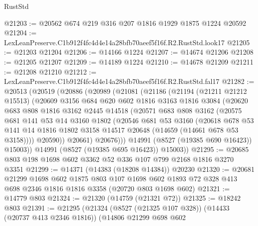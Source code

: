 \begin{lexlean}{RustStd}
\begin{coremodule}
@21203 := @20562 @674 @219 @316 @207 @1816 @1929 @1875 @1224 @20592
@21204 := LexLeanPreserve.C1b912f4fc4d4e14a28bfb70aeef5f16f.R2.RustStd.look17
@21205 := @21203 @21204
@21206 := @14166 @1224
@21207 := @14674 @21206
@21208 := @21205 @21207
@21209 := @14189 @1224
@21210 := @14678 @21209
@21211 := @21208 @21210
@21212 := LexLeanPreserve.C1b912f4fc4d4e14a28bfb70aeef5f16f.R2.RustStd.fal17
@21282 := @20513
    (@20519
      (@20886
        (@20989
          (@21081
            (@21186
              (@21194
                (@21211 @21212 @15513)
                (@20609
                  @3156
                  @684
                  @620
                  @602
                  @1816
                  @3163
                  @1816
                  @3084
                  (@20620
                    @683
                    @808
                    @1816
                    @3162
                    @2445
                    @14518
                    (@20571
                      @683
                      @808
                      @3162
                      (@20575
                        @681
                        @141
                        @53
                        @14
                        @3160
                        @1802
                        (@20546
                          @681
                          @53
                          @3160
                          (@20618
                            @678
                            @53
                            @141
                            @14
                            @1816
                            @1802
                            @3158
                            @14517
                            @20648
                            (@14659 (@14661 @678 @53 @3158))))
                        @20590))
                    @20661)
                  @20676)))
            @14991
            (@8527 (@19385 @690 @16423))
            @15003))
        @14991
        (@8527 (@19385 @695 @16423))
        @15003))
@21295 := @20685 @803 @198 @1698 @602 @3362 @52 @336 @107 @799 @2168 @1816 @3270 @3351
@21299 := @14371 (@14383 (@18208 @14384)) @20230
@21320 := @20681
    @21299
    @1698
    @602
    @1875
    @803
    @107
    @1698
    @602
    @1893
    @72
    @328
    @413
    @698
    @2346
    @1816
    @1816
    @3358
    (@20720 @803 @1698 @602)
@21321 := @14779 @803
@21324 := @21320 (@14759 (@21321 @72))
@21325 := @18242 @803
@21391 := @21295
    (@21324
      (@8527 (@21325 @107 @328))
      (@14433 (@20737 @413 @2346 @1816))
      (@14806
        @21299
        @698
        @602

\end{coremodule}
\end{lexlean}

